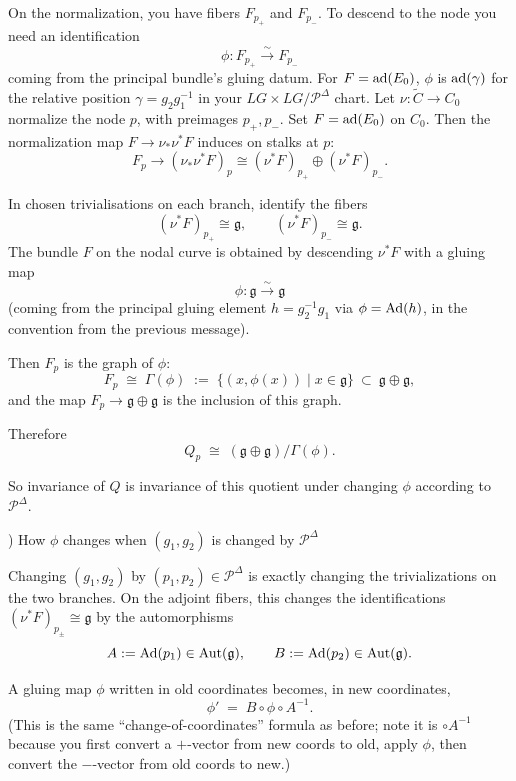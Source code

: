 \documentclass[12pt]{article}
\begin{document}
    On the normalization, you have fibers $F_{p_+}$ and $F_{p_-}$. To descend to the node you need an identification
    \[
    \phi: F_{p_+} \xrightarrow{\sim} F_{p_-}
    \]
    coming from the principal bundle's gluing datum. For $F = \operatorname{ad}(E_0)$, $\phi$ is $\operatorname{ad}(\gamma)$ for the relative position $\gamma = g_2 g_1^{-1}$ in your $LG \times LG / \mathcal{P}^\Delta$ chart.
    Let $\nu:\widetilde C\to C_0$ normalize the node $p$, with preimages $p_+,p_-$. Set $F=\operatorname{ad}(E_0)$ on $C_0$. Then the normalization map $F\to \nu_*\nu^*F$ induces on stalks at $p$:
    \[
    F_p \longrightarrow (\nu_*\nu^*F)_p \cong (\nu^*F)_{p_+}\oplus (\nu^*F)_{p_-}.
    \]

In chosen trivialisations on each branch, identify the fibers
    \[
    (\nu^*F)_{p_+}\cong \mathfrak{g},\qquad (\nu^*F)_{p_-}\cong \mathfrak{g}.
    \]
The bundle $F$ on the nodal curve is obtained by descending $\nu^*F$ with a gluing map
    \[
    \phi:\mathfrak{g} \xrightarrow{\sim}\mathfrak{g}
    \]
(coming from the principal gluing element $h=g_2^{-1}g_1$ via $\phi=\operatorname{Ad}(h)$, in the convention from the previous message).

Then $F_p$ is the graph of $\phi$:
    \[
    F_p \;\cong\; \Gamma(\phi)\;:=\;\{(x,\phi(x))\mid x\in \mathfrak{g}\}\ \subset\ \mathfrak{g}\oplus \mathfrak{g},
    \]
and the map $F_p\to \mathfrak{g}\oplus\mathfrak{g}$ is the inclusion of this graph.

Therefore
    \[
    Q_p \;\cong\; (\mathfrak{g}\oplus \mathfrak{g})\big/\Gamma(\phi). \tag{A}
    \]

So invariance of $Q$ is invariance of this quotient under changing $\phi$ according to $\mathcal{P}^\Delta$.

\medskip

) How $\phi$ changes when $(g_1,g_2)$ is changed by $\mathcal{P}^\Delta$

Changing $(g_1,g_2)$ by $(p_1,p_2)\in \mathcal{P}^\Delta$ is exactly changing the trivializations on the two branches. On the adjoint fibers, this changes the identifications $(\nu^*F)_{p_\pm}\cong\mathfrak{g}$ by the automorphisms
\[
A:=\operatorname{Ad}(p_1)\in \operatorname{Aut}(\mathfrak{g}),\qquad B:=\operatorname{Ad}(p_2)\in \operatorname{Aut}(\mathfrak{g}).
\]

A gluing map $\phi$ written in old coordinates becomes, in new coordinates,
    \[
    \phi' \;=\; B\circ \phi \circ A^{-1}. \tag{B}
    \]
(This is the same ``change-of-coordinates'' formula as before; note it is $\circ A^{-1}$ because you first convert a $+$-vector from new coords to old, apply $\phi$, then convert the $-$-vector from old coords to new.)
\end{document}
